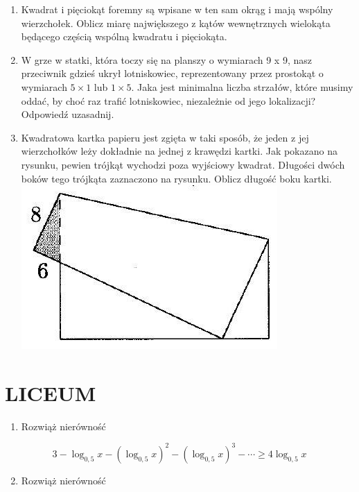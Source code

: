\documentclass[10pt]{article}
\begin{document}
\begin{enumerate}
  \item Kwadrat i pięciokąt foremny są wpisane w ten sam okrąg i mają wspólny wierzchołek. Oblicz miarę największego z kątów wewnętrznych wielokąta będącego częścią wspólną kwadratu i pięciokąta.
  \item W grze w statki, która toczy się na planszy o wymiarach 9 x 9, nasz przeciwnik gdzieś ukrył lotniskowiec, reprezentowany przez prostokąt o wymiarach \(5 \times 1\) lub \(1 \times 5\). Jaka jest minimalna liczba strzałów, które musimy oddać, by choć raz trafić lotniskowiec, niezależnie od jego lokalizacji? Odpowiedź uzasadnij.
  \item Kwadratowa kartka papieru jest zgięta w taki sposób, że jeden z jej wierzchołków leży dokładnie na jednej z krawędzi kartki. Jak pokazano na rysunku, pewien trójkąt wychodzi poza wyjściowy kwadrat. Długości dwóch boków tego trójkąta zaznaczono na rysunku. Oblicz długość boku kartki.\\
\includegraphics[max width=\textwidth, center]{2024_11_21_72654931dc1bb30ea233g-1}
\end{enumerate}

\section*{LICEUM}
\begin{enumerate}
  \item Rozwiąż nierówność
\end{enumerate}

\[
3-\log _{0,5} x-\left(\log _{0,5} x\right)^{2}-\left(\log _{0,5} x\right)^{3}-\cdots \geq 4 \log _{0,5} x
\]

\begin{enumerate}
  \setcounter{enumi}{1}
  \item Rozwiąż nierówność
\end{enumerate}
\end{document}
